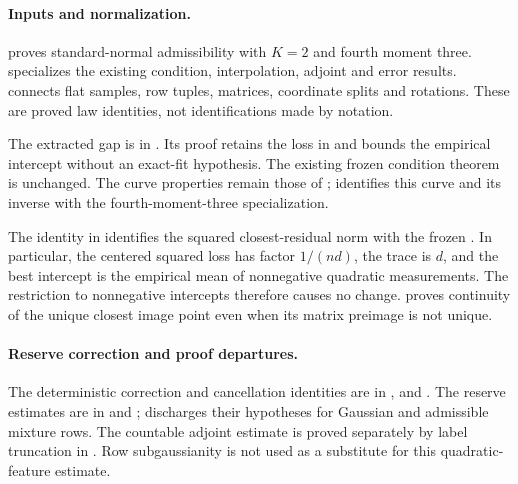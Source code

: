 \documentclass[11pt]{article}
\theoremstyle{remark}
\begin{document}
\paragraph{Inputs and normalization.}
 proves standard-normal admissibility with $K=2$
and fourth moment three.  specializes the
existing condition, interpolation, adjoint and error results.
 connects flat samples, row tuples, matrices,
coordinate splits and rotations. These are proved law identities, not
identifications made by notation.

The extracted gap is  in
. Its proof retains the loss in
 and bounds the empirical intercept without an
exact-fit hypothesis. The existing frozen condition theorem is unchanged.
The curve properties remain those of ;
 identifies this curve
and its inverse with the fourth-moment-three specialization.

The identity  in
 identifies the squared closest-residual
norm with the frozen . In particular,
the centered squared loss has factor $1/(nd)$, the trace is $d$, and the
best intercept is the empirical mean of nonnegative quadratic
measurements. The restriction to nonnegative intercepts therefore
causes no change.  proves
continuity of the unique closest image point even when its matrix
preimage is not unique.

\paragraph{Reserve correction and proof departures.}
The deterministic correction and cancellation identities are in
,
 and
.
The reserve estimates are in
 and
;  discharges
their hypotheses for Gaussian and admissible mixture rows.
The countable adjoint estimate is proved separately by label truncation
in . Row subgaussianity is not used as a substitute
for this quadratic-feature estimate.
\end{document}
